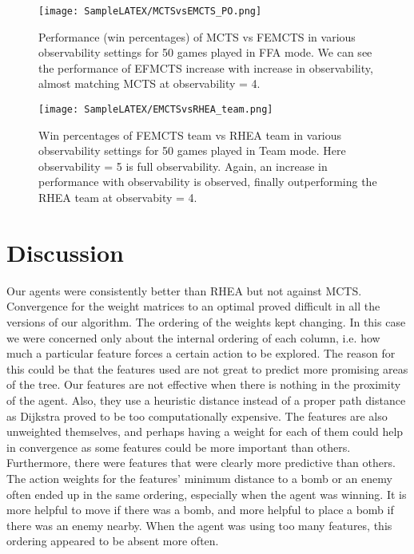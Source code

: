 \documentclass{llncs}
\begin{document}
\begin{figure}
    \centering
    \texttt{[image: SampleLATEX/MCTSvsEMCTS\_PO.png]}
    \caption{Performance (win percentages) of MCTS vs FEMCTS in various observability settings for 50 games played in FFA mode. We can see the performance of EFMCTS increase with increase in observability, almost matching MCTS at observability = 4.}
    \label{fig:pommerman}
\end{figure}
\vspace{5mm}
\begin{figure}
    \centering
    \texttt{[image: SampleLATEX/EMCTSvsRHEA\_team.png]}
    \caption{Win percentages of FEMCTS team vs RHEA team in various observability settings for 50 games played in Team mode. Here observability = 5 is full observability. Again, an increase in performance with observability is observed, finally outperforming the RHEA team at observabity = 4.}
    \label{fig:pommerman}
\end{figure}

\vspace{50mm}

\section{Discussion} \label{sec:discussion}

\noindent
Our agents were consistently better than RHEA but not against MCTS.
Convergence for the weight matrices to an optimal proved difficult in all the versions of our algorithm. The ordering of the weights kept changing. In this case we were concerned only about the internal ordering of each column, i.e. how much a particular feature forces a certain action to be explored. The reason for this could be that the features used are not great to predict more promising areas of the tree. Our features are not effective when there is nothing in the proximity of the agent. Also, they use a heuristic distance instead of a proper path distance as Dijkstra proved to be too computationally expensive. The features are also unweighted themselves, and perhaps having a weight for each of them could help in convergence as some features could be more important than others. Furthermore, there were features that were clearly more predictive than others. The action weights for the features' minimum distance to a bomb or an enemy often ended up in the same ordering, especially when the agent was winning. It is more helpful to move if there was a bomb, and more helpful to place a bomb if there was an enemy nearby. When the agent was using too many features, this ordering appeared to be absent more often.\\
\end{document}
